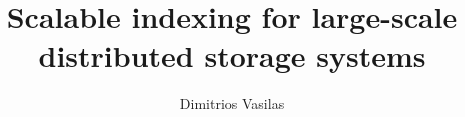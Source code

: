 \documentclass[a4paper]{report}
\title{Scalable indexing for large-scale distributed storage systems}
\author{Dimitrios Vasilas}
\date{}
\begin{document}
\maketitle

\listoftodos

\tableofcontents


\end{document}
